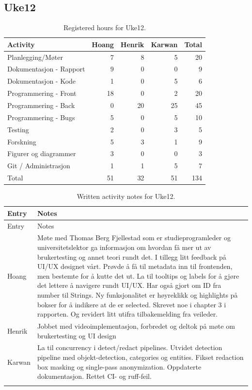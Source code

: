 \subsection{Uke12}

\begin{table}[H]
\centering
\small
\caption{Registered hours for Uke12.}
\label{tab:project-hours-uke12}
\begin{tabular}{lrrrr}
\toprule
Activity & Hoang & Henrik & Karwan & Total \\
\midrule
Planlegging/Møter & 7 & 8 & 5 & 20 \\
Dokumentasjon - Rapport & 9 & 0 & 0 & 9 \\
Dokumentasjon - Kode & 1 & 0 & 5 & 6 \\
Programmering - Front & 18 & 0 & 2 & 20 \\
Programmering - Back & 0 & 20 & 25 & 45 \\
Programmering - Bugs & 5 & 0 & 5 & 10 \\
Testing & 2 & 0 & 3 & 5 \\
Forskning & 5 & 3 & 1 & 9 \\
Figurer og diagrammer & 3 & 0 & 0 & 3 \\
Git / Administrasjon & 1 & 1 & 5 & 7 \\
\midrule
Total & 51 & 32 & 51 & 134 \\
\bottomrule
\end{tabular}
\end{table}

\begin{longtable}{p{}p{}}
\caption{Written activity notes for Uke12.}\\
\toprule
Entry & Notes \\
\midrule
\endfirsthead
\toprule
Entry & Notes \\
\midrule
\endhead
Hoang & Møte med Thomas Berg Fjellestad som er studieprogramleder og universitetslektor ga informasjon om hvordan få mer ut av brukertesting og annet teori rundt det. I tillegg litt feedback på UI/UX designet vårt. Prøvde å få til metadata inn til frontenden, men bestemte for å kutte det ut. La til tooltips og labels for å gjøre det lettere å navigere rundt UI/UX. Har også gjort om ID fra number til Strings. Ny funksjonalitet er høyreklikk og highlights på bokser for å indikere at de er selected. Skrevet noe i chapter 3 i rapporten. Og revidert litt utifra tilbakemelding fra veileder. \\
\addlinespace
Henrik & Jobbet med videoimplementasjon, forbredet og deltok på møte om brukertesting og UI design \\
\addlinespace
Karwan & La til concurrency i detect/redact pipelines. Utvidet detection pipeline med objekt-detection, categories og entities. Fikset redaction box masking og single-pass anonymization. Oppdaterte dokumentasjon. Rettet CI- og ruff-feil. \\
\addlinespace
\bottomrule
\end{longtable}

